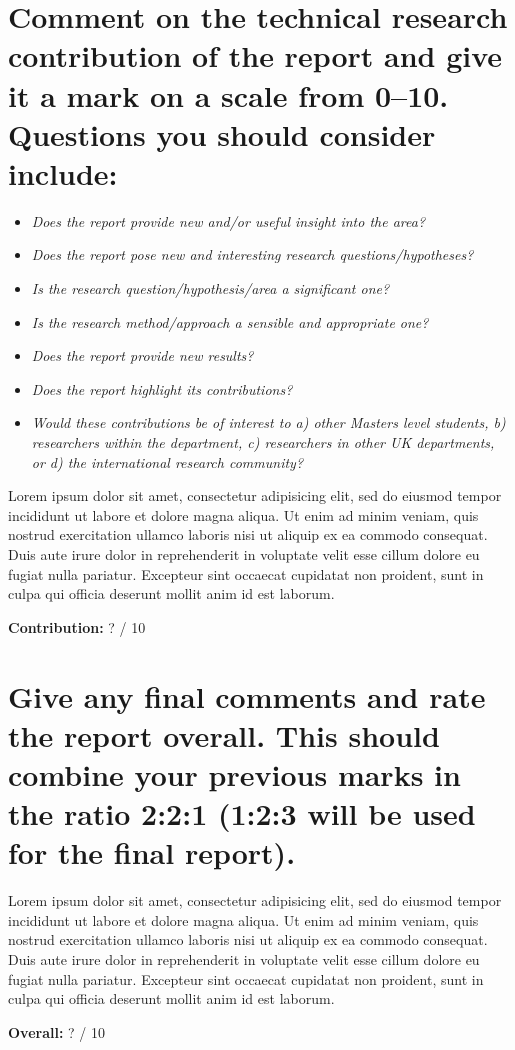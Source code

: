 \documentclass[10pt,a4paper]{article}
\begin{document}
\section{Comment on the technical research contribution of the report and give it a mark on a scale from 0–10. Questions you should consider include:}

\begin{itemize}\addtolength{\itemsep}{-0.5\baselineskip}
	\item \emph{Does the report provide new and/or useful insight into the area?}
	\item \emph{Does the report pose new and interesting research questions/hypotheses?}
	\item \emph{Is the research question/hypothesis/area a significant one?}
	\item \emph{Is the research method/approach a sensible and appropriate one?}
	\item \emph{Does the report provide new results?}
	\item \emph{Does the report highlight its contributions?}
	\item \emph{Would these contributions be of interest to a) other Masters level students, b) researchers within the department, c) researchers in other UK departments, or d) the international research community?}
\end{itemize}

\begin{framed}
Lorem ipsum dolor sit amet, consectetur adipisicing elit, sed do eiusmod
tempor incididunt ut labore et dolore magna aliqua. Ut enim ad minim veniam,
quis nostrud exercitation ullamco laboris nisi ut aliquip ex ea commodo
consequat. Duis aute irure dolor in reprehenderit in voluptate velit esse
cillum dolore eu fugiat nulla pariatur. Excepteur sint occaecat cupidatat non
proident, sunt in culpa qui officia deserunt mollit anim id est laborum.

\flushright \textbf{Contribution:} ? / 10
\end{framed}


\section{Give any final comments and rate the report overall.  This should combine your previous marks in the ratio 2:2:1 (1:2:3 will be used for the final report).}

\begin{framed}
Lorem ipsum dolor sit amet, consectetur adipisicing elit, sed do eiusmod
tempor incididunt ut labore et dolore magna aliqua. Ut enim ad minim veniam,
quis nostrud exercitation ullamco laboris nisi ut aliquip ex ea commodo
consequat. Duis aute irure dolor in reprehenderit in voluptate velit esse
cillum dolore eu fugiat nulla pariatur. Excepteur sint occaecat cupidatat non
proident, sunt in culpa qui officia deserunt mollit anim id est laborum.

\flushright \textbf{Overall:} ? / 10
\end{framed}
\end{document}
